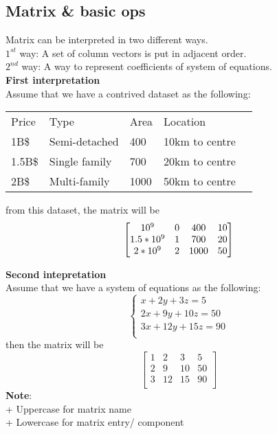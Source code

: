 \documentclass[12pt,a4paper]{article}
\begin{document}
\subsection{Matrix \& basic ops}
Matrix can be interpreted in two different ways.\\
\indent $1^{st}$ way: A set of column vectors is put in adjacent order.\\
\indent $2^{nd}$ way: A way to represent coefficients of system of equations.\\

\noindent \textbf{First interpretation}\\
Assume that we have a contrived dataset as the following:\\
\begin{table}[h!]
	\begin{center}
		\begin{tabular}{l|l|l|l|l}
		Price  & Type          & Area & Location       &  \\
		1B\$   & Semi-detached & 400  & 10km to centre &  \\
		1.5B\$ & Single family & 700  & 20km to centre &  \\
		2B\$   & Multi-family  & 1000 & 50km to centre & 
		\end{tabular}
	\end{center}
\end{table}
\newline
from this dataset, the matrix will be
\begin{displaymath}
	\mqty[10^9& 0& 400 & 10\\
	1.5*10^9  & 1& 700 & 20\\
	2*10^9    & 2& 1000& 50\\]
\end{displaymath}


\noindent \textbf{Second intepretation}\\
Assume that we have a system of equations as the following:\\
\begin{displaymath}
\begin{cases}
	x+2y+3z=5\\
	2x+9y+10z=50\\
	3x+12y+15z=90\\
\end{cases}
\end{displaymath}
then the matrix will be
\begin{displaymath}
\left[
\begin{array}{ccc|c}
1&  2&   3& 5\\
2&  9&  10& 50\\
3&  12& 15& 90\\
\end{array}
\right]
\end{displaymath}
\textbf{Note}:\\
+ Uppercase for matrix name\\
+ Lowercase for matrix entry/ component\\
\end{document}

